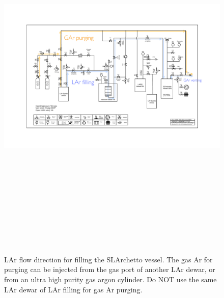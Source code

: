 \documentclass[letterpaper,11pt]{article}
\begin{document}
\begin{figure}[htb]
\begin{center}
\includegraphics[angle=90,origin=c,height=7.2in]{fig/LArFilling_PIDv8.3.pdf}
\caption{LAr flow direction for filling the SLArchetto vessel.  The gas Ar for purging can be injected from the gas port 
of another LAr dewar, or from an ultra high purity gas argon cylinder.  Do NOT use the same LAr dewar of LAr filling 
for gas Ar purging.}
\end{center}
\end{figure}
\end{document}
